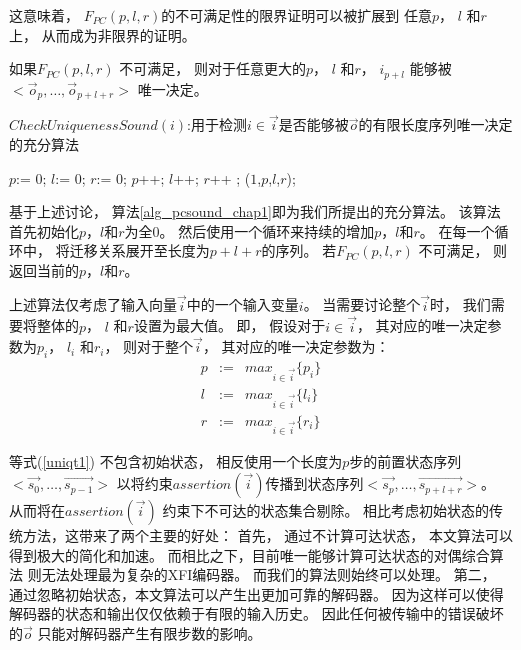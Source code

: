 这意味着，
$F_{PC}(p,l,r)$的不可满足性的限界证明可以被扩展到
任意$p$， $l$ 和$r$上，
从而成为非限界的证明。

\begin{proposition}\label{prop_pc1}
如果$F_{PC}(p,l,r)$ 不可满足，
则对于任意更大的$p$， $l$ 和$r$，
$i_{p+l}$ 能够被$<\vec{o}_{p},\dots,\vec{o}_{p+l+r}>$ 唯一决定。
\end{proposition}

\begin{algorithm}[t]
\caption{$CheckUniquenessSound(i)$:用于检测$i\in\vec{i}$是否能够被$\vec{o}$的有限长度序列唯一决定的充分算法}
\label{alg_pcsound_chap1}
\begin{algorithmic}[1]
\STATE $p$:= 0;
\STATE $l$:= 0;
\STATE $r$:= 0;
\STATE $p$++;
\STATE $l$++;
\STATE $r$++ ;
\label{linepc1sound}
\RETURN ($1$,$p$,$l$,$r$)\label{lineln1sound};
\ENDIF
\ENDWHILE
\end{algorithmic}
\end{algorithm}

%

基于上述讨论，
算法\ref{alg_pcsound_chap1}即为我们所提出的充分算法。
该算法首先初始化$p$，$l$和$r$为全0。
然后使用一个循环来持续的增加$p$，$l$和$r$。
在每一个循环中，
将迁移关系展开至长度为$p+l+r$的序列。
若$F_{PC}(p,l,r)$ 不可满足，
则返回当前的$p$，$l$和$r$。


上述算法仅考虑了输入向量$\vec{i}$中的一个输入变量$i$。
当需要讨论整个$\vec{i}$时，
我们需要将整体的$p$， $l$ 和$r$设置为最大值。
即，
假设对于$i\in\vec{i}$，
其对应的唯一决定参数为$p_i$， $l_i$ 和$r_i$，
则对于整个$\vec{i}$，
其对应的唯一决定参数为：
\begin{equation}\label{equ_maxplr}
\begin{array}{ccc}
p & :=  & max_{i\in\vec{i}} \{p_i\}\\
l & :=  & max_{i\in\vec{i}} \{l_i\}\\
r & :=  & max_{i\in\vec{i}} \{r_i\}
\end{array}
\end{equation}

等式(\ref{uniqt1}) 不包含初始状态，
相反使用一个长度为$p$步的前置状态序列$<\vec{s_0},\dots,\vec{s_{p-1}}>$
以将约束$assertion(\vec{i})$传播到状态序列$<\vec{s_p},\dots,\vec{s_{p+l+r}}>$。
从而将在$assertion(\vec{i})$ 约束下不可达的状态集合剔除。
相比考虑初始状态的传统方法，这带来了两个主要的好处：
首先，
通过不计算可达状态，
本文算法可以得到极大的简化和加速。
而相比之下，目前唯一能够计算可达状态的对偶综合算法
则无法处理最为复杂的XFI编码器。
而我们的算法则始终可以处理。
第二，
通过忽略初始状态，本文算法可以产生出更加可靠的解码器。
因为这样可以使得解码器的状态和输出仅仅依赖于有限的输入历史。
因此任何被传输中的错误破坏的$\vec{o}$ 只能对解码器产生有限步数的影响。

